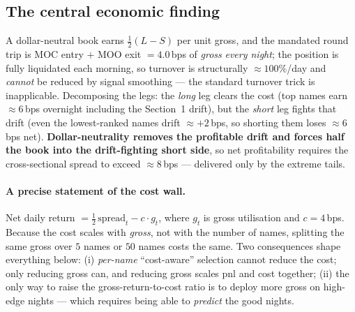 \documentclass[11pt,a4paper]{article}
\begin{document}
\subsection{The central economic finding}
A dollar-neutral book earns $\tfrac12(L-S)$ per unit gross, and the mandated round trip is MOC entry $+$ MOO
exit $=4.0$\,bps of \emph{gross} \emph{every night}; the position is fully liquidated each morning, so turnover
is structurally $\approx100\%$/day and \emph{cannot} be reduced by signal smoothing --- the standard turnover
trick is inapplicable. Decomposing the legs: the \emph{long} leg clears the cost (top names earn $\approx6$\,bps
overnight including the Section~1 drift), but the \emph{short} leg fights that drift (even the lowest-ranked
names drift $\approx+2$\,bps, so shorting them loses $\approx6$\,bps net). \textbf{Dollar-neutrality removes the
profitable drift and forces half the book into the drift-fighting short side}, so net profitability requires the
cross-sectional spread to exceed $\approx8$\,bps --- delivered only by the extreme tails.

\paragraph{A precise statement of the cost wall.} Net daily return $=\tfrac12\,\mathrm{spread}_t - c\cdot g_t$,
where $g_t$ is gross utilisation and $c=4$\,bps. Because the cost scales with \emph{gross}, not with the number
of names, splitting the same gross over $5$ names or $50$ names costs the same. Two consequences shape
everything below: (i) \emph{per-name} ``cost-aware'' selection cannot reduce the cost; only reducing gross can,
and reducing gross scales pnl and cost together; (ii) the only way to raise the gross-return-to-cost ratio is to
deploy more gross on high-edge nights --- which requires being able to \emph{predict} the good nights.
\end{document}
